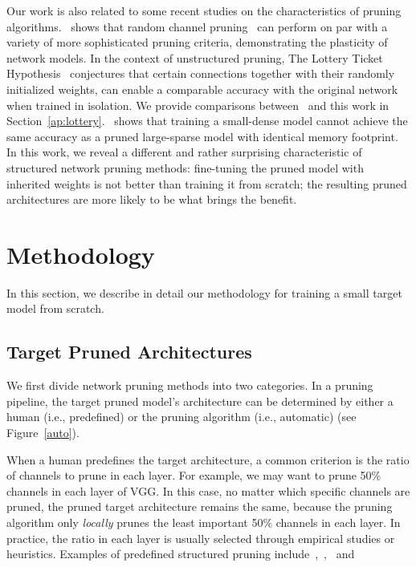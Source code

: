 Our work is also related to some recent studies on the characteristics of pruning algorithms.~\cite{recovering} shows that random channel pruning~\cite{compact} can perform on par with a variety of more sophisticated pruning criteria, demonstrating the plasticity of network models. 
In the context of unstructured pruning, The Lottery Ticket Hypothesis~\cite{lottery} conjectures that  certain connections together with their randomly initialized weights, can enable a comparable accuracy with the original network when trained in isolation. We provide comparisons between~\cite{lottery} and this work in Section~\ref{ap:lottery}.~\cite{toprune} shows that training a small-dense model cannot achieve the same accuracy as a pruned large-sparse model with identical memory footprint. In this work, we reveal a different and rather surprising characteristic of structured network pruning methods: fine-tuning the pruned model with inherited weights is not better than training it from scratch; the resulting pruned architectures are more likely to be what brings the benefit.


\section{Methodology}
In this section, we describe in detail our methodology for training a small target model from scratch.


\subsection{Target Pruned Architectures} We first divide network pruning methods into two categories. In a pruning pipeline, the target pruned model's architecture can be determined by either a human (i.e., predefined) or the pruning algorithm (i.e., automatic) (see Figure~\ref{auto}).

When a human predefines the target architecture, a common criterion is the ratio of channels to prune in each layer. For example, we may want to prune 50\% channels in each layer of VGG. In this case, no matter which specific channels are pruned, the pruned target architecture remains the same, because the pruning algorithm only \emph{locally} prunes the least important 50\% channels in each layer. In practice, the ratio in each layer is usually selected through empirical studies or heuristics. Examples of predefined structured pruning include~\cite{li2016pruning},~\cite{luo2017thinet},~\cite{he2017channel} and~\cite{he2018sfp}

